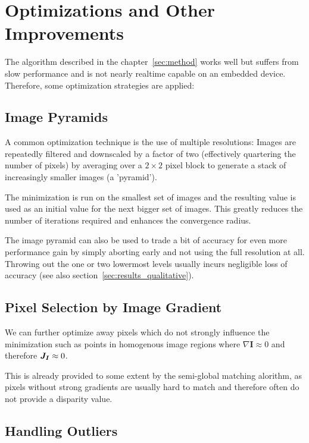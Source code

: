 \chapter{Optimizations and Other Improvements}
\label{sec:optimizations}

The algorithm described in the chapter~\ref{sec:method} works well but suffers from
slow performance and is not nearly realtime capable on an embedded device.
Therefore, some optimization strategies are applied:

\section{Image Pyramids}
\label{sec:pyramids}

A common optimization technique is the use of multiple resolutions: Images are
repeatedly filtered and downscaled by a factor of two (effectively quartering
the number of pixels) by averaging over a $2 \times 2$ pixel block to generate
a stack of increasingly smaller images (a 'pyramid').

The minimization is run on the smallest set of images and the resulting value
is used as an initial value for the next bigger set of images.
This greatly reduces the number of iterations required and enhances the
convergence radius.

The image pyramid can also be used to trade a bit of accuracy for even more
performance gain by simply aborting early and not using the full resolution at
all. Throwing out the one or two lowermost levels usually incurs negligible
loss of accuracy (see also section~\ref{sec:results_qualitative}).


\section{Pixel Selection by Image Gradient}
\label{sec:gradient_filtering}

We can further optimize away pixels which do not strongly influence the
minimization such as points in homogenous image regions where $\nabla
\mathbf{I} \approx 0$ and therefore $\mat{J_I} \approx 0$.

This is already provided to some extent by the semi-global matching alorithm,
as pixels without strong gradients are usually hard to match and therefore often
do not provide a disparity value.

\section{Handling Outliers}

